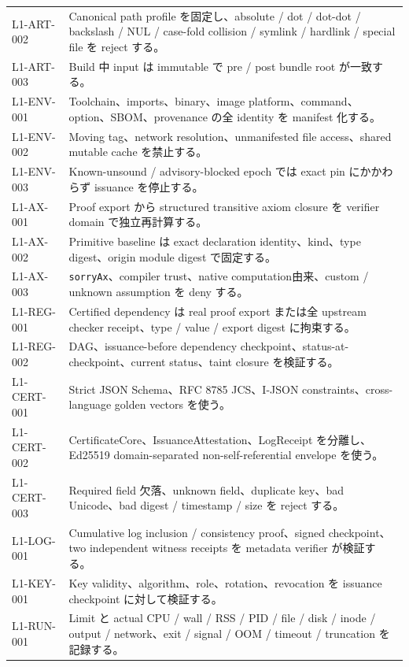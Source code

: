 \documentclass[a4paper,11pt]{ltjsarticle}
\newcommand{\code}[1]{\texttt{#1}}
\begin{document}
\begin{longtable}{@{}L{28mm}L{127mm}@{}}
L1-ART-002 & Canonical path profile を固定し、absolute / dot / dot-dot / backslash / NUL / case-fold collision / symlink / hardlink / special file を reject する。 \\
L1-ART-003 & Build 中 input は immutable で pre / post bundle root が一致する。 \\
L1-ENV-001 & Toolchain、imports、binary、image platform、command、option、SBOM、provenance の全 identity を manifest 化する。 \\
L1-ENV-002 & Moving tag、network resolution、unmanifested file access、shared mutable cache を禁止する。 \\
L1-ENV-003 & Known-unsound / advisory-blocked epoch では exact pin にかかわらず issuance を停止する。 \\
L1-AX-001 & Proof export から structured transitive axiom closure を verifier domain で独立再計算する。 \\
L1-AX-002 & Primitive baseline は exact declaration identity、kind、type digest、origin module digest で固定する。 \\
L1-AX-003 & \code{sorryAx}、compiler trust、native computation由来、custom / unknown assumption を deny する。 \\
L1-REG-001 & Certified dependency は real proof export または全 upstream checker receipt、type / value / export digest に拘束する。 \\
L1-REG-002 & DAG、issuance-before dependency checkpoint、status-at-checkpoint、current status、taint closure を検証する。 \\
L1-CERT-001 & Strict JSON Schema、RFC 8785 JCS、I-JSON constraints、cross-language golden vectors を使う。 \\
L1-CERT-002 & CertificateCore、IssuanceAttestation、LogReceipt を分離し、Ed25519 domain-separated non-self-referential envelope を使う。 \\
L1-CERT-003 & Required field 欠落、unknown field、duplicate key、bad Unicode、bad digest / timestamp / size を reject する。 \\
L1-LOG-001 & Cumulative log inclusion / consistency proof、signed checkpoint、two independent witness receipts を metadata verifier が検証する。 \\
L1-KEY-001 & Key validity、algorithm、role、rotation、revocation を issuance checkpoint に対して検証する。 \\
L1-RUN-001 & Limit と actual CPU / wall / RSS / PID / file / disk / inode / output / network、exit / signal / OOM / timeout / truncation を記録する。 \\

\end{longtable}
\end{document}
